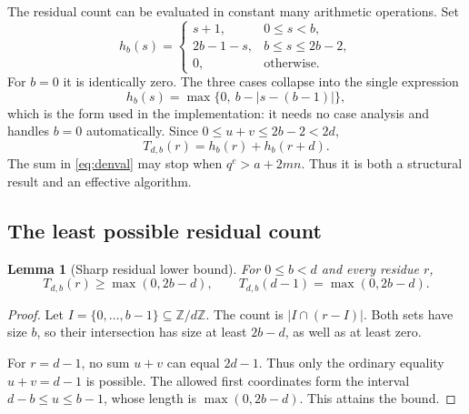 \documentclass[11pt,a4paper]{article}
\numberwithin{equation}{section}
\newtheorem{lemma}[theorem]{Lemma}
\theoremstyle{definition}
\theoremstyle{remark}
\newcommand{\Z}{\mathbb{Z}}
\newcommand{\abs}[1]{\left|#1\right|}
\begin{document}
The residual count can be evaluated in constant many arithmetic operations. Set
\[
 h_b(s)=
 \begin{cases}
 s+1,&0\leq s<b,\\
 2b-1-s,&b\leq s\leq2b-2,\\
 0,&\text{otherwise}.
 \end{cases}
\]
For $b=0$ it is identically zero. The three cases collapse into the single expression
\begin{equation}\label{eq:htriangleclosed}
 h_b(s)=\max\bigl\{0,\ b-\abs{s-(b-1)}\bigr\},
\end{equation}
which is the form used in the implementation: it needs no case analysis and handles $b=0$ automatically. Since $0\leq u+v\leq2b-2<2d$,
\begin{equation}\label{eq:Ttriangle}
 T_{d,b}(r)=h_b(r)+h_b(r+d).
\end{equation}
The sum in \eqref{eq:denval} may stop when $q^e>a+2mn$. Thus it is both a structural result and an effective algorithm.

\subsection{The least possible residual count}
\begin{lemma}[Sharp residual lower bound]\label{lem:Tmin}
For $0\leq b<d$ and every residue $r$,
\begin{equation}\label{eq:Tmin}
 T_{d,b}(r)\geq\max(0,2b-d),\qquad
 T_{d,b}(d-1)=\max(0,2b-d).
\end{equation}
\end{lemma}
\begin{proof}
Let $I=\{0,\ldots,b-1\}\subseteq\Z/d\Z$. The count is $|I\cap(r-I)|$. Both sets have size $b$, so their intersection has size at least $2b-d$, as well as at least zero.

For $r=d-1$, no sum $u+v$ can equal $2d-1$. Thus only the ordinary equality $u+v=d-1$ is possible. The allowed first coordinates form the interval $d-b\leq u\leq b-1$, whose length is $\max(0,2b-d)$. This attains the bound.
\end{proof}
\end{document}
